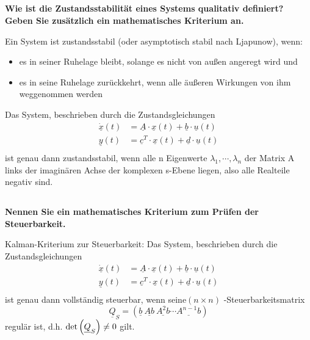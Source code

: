 \subsection{}
\textbf{Wie ist die Zustandsstabilität eines Systems qualitativ definiert? Geben Sie zusätzlich ein mathematisches Kriterium an.}

Ein System ist zustandsstabil (oder asymptotisch stabil nach Ljapunow), wenn:
\begin{itemize}
    \item es in seiner Ruhelage bleibt, solange es nicht von außen angeregt wird und
    \item es in seine Ruhelage zurückkehrt, wenn alle äußeren Wirkungen von ihm weggenommen werden
\end{itemize}
Das System, beschrieben durch die Zustandsgleichungen
\begin{equation}
    \begin{aligned}
        \dot{\underline{x}}(t) & =\underline{A}\cdot\underline{x}(t)+\underline{b}\cdot\underline{u}(t)   \\
        \underline{y}(t)       & =\underline{c}^T\cdot\underline{x}(t)+\underline{d}\cdot\underline{u}(t) \\
    \end{aligned}
\end{equation}
ist genau dann zustandsstabil, wenn alle n Eigenwerte $\lambda_1,\cdots,\lambda_n$ der Matrix A links der imaginären Achse
der komplexen s-Ebene liegen, also alle Realteile negativ sind.

\subsection{}
\textbf{Nennen Sie ein mathematisches Kriterium zum Prüfen der Steuerbarkeit.}

Kalman-Kriterium zur Steuerbarkeit:
Das System, beschrieben durch die Zustandsgleichungen
\begin{equation}
    \begin{aligned}
        \dot{\underline{x}}(t) & =\underline{A}\cdot\underline{x}(t)+\underline{b}\cdot\underline{u}(t)   \\
        \underline{y}(t)       & =\underline{c}^T\cdot\underline{x}(t)+\underline{d}\cdot\underline{u}(t) \\
    \end{aligned}
\end{equation}
ist genau dann vollständig steuerbar, wenn seine$(n\times n)$ -Steuerbarkeitsmatrix
\begin{equation}
    \underline{Q}_S=\left(\underline{b}\ \underline{Ab}\ \underline{A^2b}\cdots\underline{A^{n-1}b}\right)
\end{equation}
regulär ist, d.h. $\mathop{}\!\mathrm{det}\left(\underline{Q}_S\right)\neq 0$ gilt.
